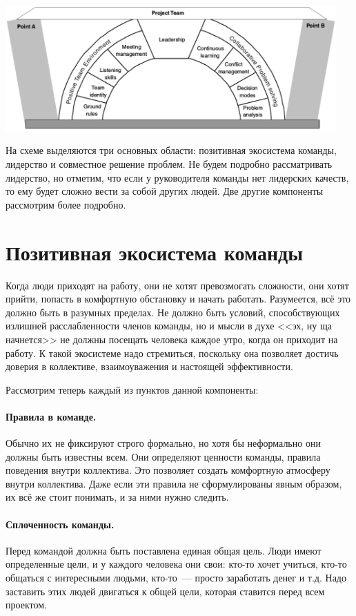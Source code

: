 \documentclass{../../text-style}
\begin{document}
\begin{center}
    \includegraphics[width=0.95\textwidth]{successfulTeamComponents.png}
\end{center}

На схеме выделяются три основных области: позитивная экосистема команды, лидерство и совместное решение проблем. Не будем подробно рассматривать лидерство, но отметим, что если у руководителя команды нет лидерских качеств, то ему будет сложно вести за собой других людей. Две другие компоненты рассмотрим более подробно.

\section{Позитивная экосистема команды}

Когда люди приходят на работу, они не хотят превозмогать сложности, они хотят прийти, попасть в комфортную обстановку и начать работать. Разумеется, всё это должно быть в разумных пределах. Не должно быть условий, способствующих излишней расслабленности членов команды, но и мысли в духе <<эх, ну ща начнется>> не должны посещать человека каждое утро, когда он приходит на работу. К такой экосистеме надо стремиться, поскольку она позволяет достичь доверия в коллективе, взаимоуважения и настоящей эффективности.

Рассмотрим теперь каждый из пунктов данной компоненты:

\paragraph*{Правила в команде.} Обычно их не фиксируют строго формально, но хотя бы неформально они должны быть известны всем. Они определяют ценности команды, правила поведения внутри коллектива. Это позволяет создать комфортную атмосферу внутри коллектива. Даже если эти правила не сформулированы явным образом, их всё же стоит понимать, и за ними нужно следить.

\paragraph*{Сплоченность команды.} Перед командой должна быть поставлена единая общая цель. Люди имеют  определенные цели, и у каждого человека они свои: кто-то хочет учиться, кто-то общаться с интересными людьми, кто-то~--- просто заработать денег и т.д. Надо заставить этих людей двигаться к общей цели, которая ставится перед всем проектом.
\end{document}
